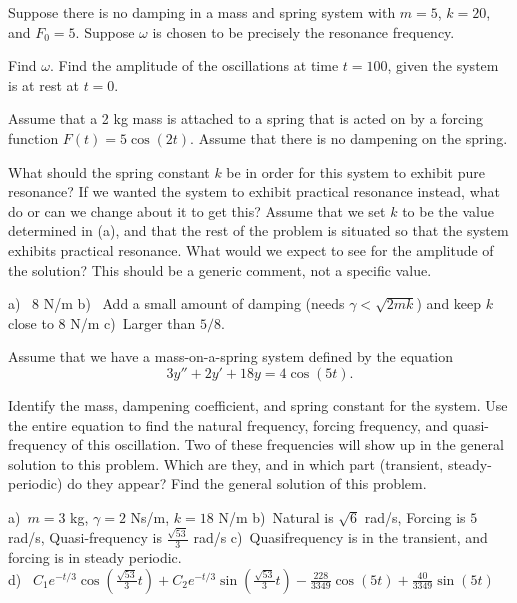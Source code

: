 \begin{exercise}\ansMark%
Suppose there is no damping in a mass and spring system with
$m = 5$, $k= 20$, and $F_0 = 5$.  Suppose $\omega$ is chosen
to be precisely the resonance frequency.
\begin{tasks}
\task
Find $\omega$.
\task
Find the amplitude of the oscillations at time $t=100$, given the system is at
rest at $t=0$.
\end{tasks}
\end{exercise}

\begin{exercise}
Assume that a 2 kg mass is attached to a spring that is acted on by a forcing function $F(t) = 5 \cos(2t)$. Assume that there is no dampening on the spring.
\begin{tasks}
\task What should the spring constant $k$ be in order for this system to exhibit pure resonance?
\task If we wanted the system to exhibit practical resonance instead, what do or can we change about it to get this?
\task Assume that we set $k$ to be the value determined in (a), and that the rest of the problem is situated so that the system exhibits practical resonance. What would we expect to see for the amplitude of the solution? This should be a generic comment, not a specific value.
\end{tasks}
\end{exercise}
\comboSol{%
}
{%
a)~ 8 N/m \quad b)~ Add a small amount of damping (needs $\gamma < \sqrt{2mk}$) and keep $k$ close to 8 N/m \quad c)~Larger than $5/8$.
}

\begin{exercise}
Assume that we have a mass-on-a-spring system defined by the equation
\begin{equation*}
3y'' + 2y' + 18y = 4\cos(5t).
\end{equation*}
\begin{tasks}
\task Identify the mass, dampening coefficient, and spring constant for the system.
\task Use the entire equation to find the natural frequency, forcing frequency, and quasi-frequency of this oscillation.
\task Two of these frequencies will show up in the general solution to this problem. Which are they, and in which part (transient, steady-periodic) do they appear?
\task Find the general solution of this problem.
\end{tasks}
\end{exercise}
\comboSol{%
}
{%
a)~$m = 3$ kg, $\gamma = 2$ Ns/m, $k = 18$ N/m \quad b)~Natural is $\sqrt{6}$ rad/s, Forcing is $5$ rad/s, Quasi-frequency is $\frac{\sqrt{53}}{3}$ rad/s \quad c)~Quasifrequency is in the transient, and forcing is in steady periodic. \\
d)~ $C_1e^{-t/3}\cos\left(\frac{\sqrt{53}}{3}t\right) + C_2e^{-t/3}\sin\left(\frac{\sqrt{53}}{3}t\right) - \frac{228}{3349} \cos(5t) + \frac{40}{3349}\sin(5t)$
}


